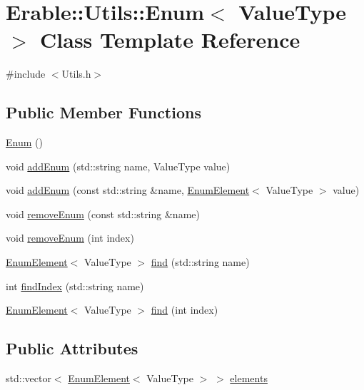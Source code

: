 \hypertarget{class_erable_1_1_utils_1_1_enum}{}\section{Erable\+::Utils\+::Enum$<$ Value\+Type $>$ Class Template Reference}
\label{class_erable_1_1_utils_1_1_enum}


{\ttfamily \#include $<$Utils.\+h$>$}

\subsection*{Public Member Functions}
\begin{DoxyCompactItemize}
\item 
\mbox{\hyperlink{class_erable_1_1_utils_1_1_enum_aa3151a7333ce05cc5767c76634330da7}{Enum}} ()
\item 
void \mbox{\hyperlink{class_erable_1_1_utils_1_1_enum_ae00f52dd3ee8b9e106119c1262c5a88b}{add\+Enum}} (std\+::string name, Value\+Type value)
\item 
void \mbox{\hyperlink{class_erable_1_1_utils_1_1_enum_a8ffb9f7e0977ecf7ae1dae1c9bf02cfb}{add\+Enum}} (const std\+::string \&name, \mbox{\hyperlink{struct_erable_1_1_utils_1_1_enum_element}{Enum\+Element}}$<$ Value\+Type $>$ value)
\item 
void \mbox{\hyperlink{class_erable_1_1_utils_1_1_enum_a0c7fd8c45816b113ddfd38e8b5efa4da}{remove\+Enum}} (const std\+::string \&name)
\item 
void \mbox{\hyperlink{class_erable_1_1_utils_1_1_enum_a1c1bf8f12602e11b0e00005e72d533ed}{remove\+Enum}} (int index)
\item 
\mbox{\hyperlink{struct_erable_1_1_utils_1_1_enum_element}{Enum\+Element}}$<$ Value\+Type $>$ \mbox{\hyperlink{class_erable_1_1_utils_1_1_enum_af71a4e37d4b83486bfd66babcbee038b}{find}} (std\+::string name)
\item 
int \mbox{\hyperlink{class_erable_1_1_utils_1_1_enum_a0d625a4c55c8cb78ff628825bff432fb}{find\+Index}} (std\+::string name)
\item 
\mbox{\hyperlink{struct_erable_1_1_utils_1_1_enum_element}{Enum\+Element}}$<$ Value\+Type $>$ \mbox{\hyperlink{class_erable_1_1_utils_1_1_enum_ad96c6e7860a53cdfe74f82f0de4c6f57}{find}} (int index)
\end{DoxyCompactItemize}
\subsection*{Public Attributes}
\begin{DoxyCompactItemize}
\item 
std\+::vector$<$ \mbox{\hyperlink{struct_erable_1_1_utils_1_1_enum_element}{Enum\+Element}}$<$ Value\+Type $>$ $>$ \mbox{\hyperlink{class_erable_1_1_utils_1_1_enum_ab9e85667fc3b55775209cce8c6f7890b}{elements}}
\end{DoxyCompactItemize}



